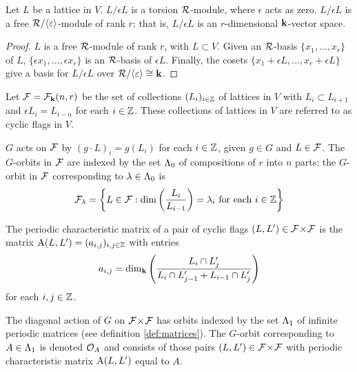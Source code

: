 \documentclass[a4paper, 11pt]{report}
\begin{document}
\begin{lemma}
Let $L$ be a lattice in $V$. $L/{\epsilon L}$ is a torsion $\mathcal{R}$-module, where $\epsilon$ acts as zero. $L/{\epsilon L}$ is a free $\mathcal{R}/{\langle \varepsilon \rangle}$-module of rank $r$; that is, $L/{\epsilon L}$ is an $r$-dimensional $\mathbf{k}$-vector space.
\end{lemma}
\begin{proof}
$L$ is a free $\mathcal{R}$-module of rank $r$, with $L\subset V$. Given an $\mathcal{R}$-basis $\{x_1,\ldots,x_r\}$ of $L$, $\{\epsilon x_1,\ldots, \epsilon x_r\}$ is an $\mathcal{R}$-basis of $\epsilon L$. Finally, the cosets $\{ x_1 + \epsilon L,\ldots, x_r + \epsilon L\}$ give a basis for $L/{\epsilon L}$ over $\mathcal{R}/{\langle \varepsilon\rangle}\cong \mathbf{k}$.
\end{proof}

Let $\mathcal{F}=\mathcal{F}_{\mathbf{k}}(n,r)$ be the set of collections $(L_i)_{i\in\mathbb{Z}}$ of lattices in $V$ with $L_i\subset L_{i+1}$ and $\epsilon L_i = L_{i-n}$ for each $i\in\mathbb{Z}$. These collections of lattices in $V$ are referred to as cyclic flags in $V$. 

$G$ acts on $\mathcal{F}$ by $(g\cdot L)_i = g(L_i)$ for each $i\in\mathbb{Z}$, given $g\in G$ and $L\in\mathcal{F}$. The $G$-orbits in $\mathcal{F}$ are indexed by the set ${\Lambda_0}$ of compositions of $r$ into $n$ parts: the $G$-orbit in $\mathcal{F}$ corresponding to $\lambda\in{\Lambda_0}$ is
\begin{equation*}
\mathcal{F}_\lambda = \left\{L\in\mathcal{F}: \dim\left(\frac{L_i}{L_{i-1}}\right) = \lambda_i \text{ for each } i\in\mathbb{Z}\right\}
\end{equation*}

\begin{definition}\label{def:characteristic-matrix}
The periodic characteristic matrix of a pair of cyclic flags $(L,L')\in{\mathcal{F}\!\times\!\mathcal{F}}$ is the matrix $\operatorname{A}(L,L')=(a_{i,j})_{i,j\in\mathbb{Z}}$ with entries
\begin{equation*}
a_{i,j} = \dim_{\mathbf{k}}\left(\frac{L_i\cap L_j'}{L_i\cap L_{j-1}' + L_{i-1}\cap L_j'}\right)
\end{equation*}
for each $i,j\in\mathbb{Z}$.
\end{definition}

The diagonal action of $G$ on ${\mathcal{F}\!\times\!\mathcal{F}}$ has orbits indexed by the set ${\Lambda_1}$ of infinite periodic matrices (see definition \ref{def:matrices}). The $G$-orbit corresponding to $A\in{\Lambda_1}$ is denoted $\mathcal{O}_{A}$ and consists of those pairs $(L,L')\in{\mathcal{F}\!\times\!\mathcal{F}}$ with periodic characteristic matrix $\operatorname{A}(L,L')$ equal to $A$.
\end{document}
